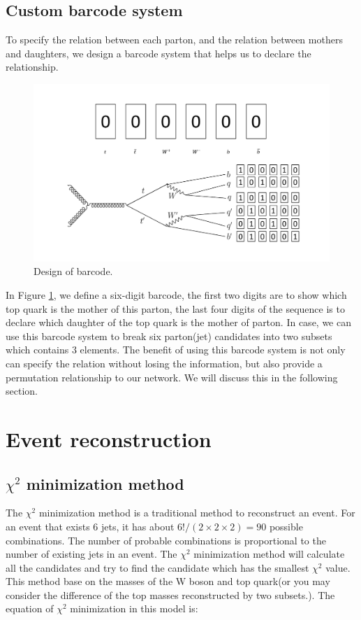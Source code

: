 \subsection{Custom barcode system}\label{subsec:barcode}
To specify the relation between each parton, and the relation between mothers and daughters, we design a barcode system that helps us to declare the relationship.
\begin{figure}[H]
	\includegraphics[width=0.8\linewidth]{Figures/barcode.pdf}
	\caption{Design of barcode.}
	\label{fig:barcode}
\end{figure}
\newpage
In Figure \ref{fig:barcode}, we define a six-digit barcode, the first two digits are to show which top quark is the mother of this parton, the last four digits of the sequence is to declare which daughter of the top quark is the mother of parton. In case, we can use this barcode system to break six parton(jet) candidates into two subsets which contains 3 elements. The benefit of using this barcode system is not only can specify the relation without losing the information, but also provide a permutation relationship to our network. We will discuss this in the following section.

\section{Event reconstruction}\label{sec:Event reconstruction}

\subsection{$\chi^{2}$ minimization method}\label{subsec:chi-square}

The $\chi^{2}$ minimization method is a traditional method to reconstruct an event. For an event that exists 6 jets, it has about $6!/(2\times2\times2)=90$ possible combinations. The number of probable combinations is proportional to the number of existing jets in an event. The $\chi^{2}$ minimization method will calculate all the candidates and try to find the candidate which has the smallest $\chi^{2}$ value. This method base on the masses of the W boson and top quark(or you may consider the difference of the top masses reconstructed by two subsets.). The equation of $\chi^{2}$ minimization in this model is:

